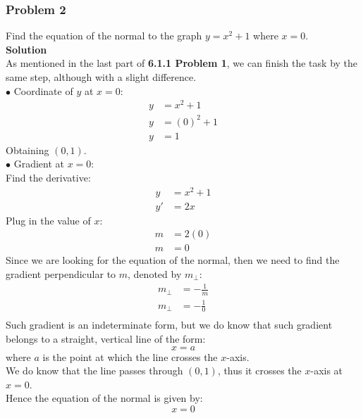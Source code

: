 \documentclass[hidelinks, a4paper, 12pt]{article}
\newcommand{\bd}{\textbf}
\newcommand{\n}{\\[\baselineskip]}
\begin{document}
            \subsubsection{Problem 2}
                Find the equation of the normal to the graph $y = x^2 + 1$ where $x = 0$.\n
                \bd{Solution}\n
                As mentioned in the last part of \bd{6.1.1 Problem 1}, we can finish the task by the same step, although with a slight
                difference.\n
                $\bullet$ Coordinate of $y$ at $x = 0$:
                \[\begin{split}
                    y &= x^2 + 1\\
                    y &= (0)^2 + 1\\
                    y &= 1
                \end{split}\]
                Obtaining $(0, 1)$.\n
                $\bullet$ Gradient at $x = 0$:\n
                Find the derivative:
                \[\begin{split}
                    y &= x^2 + 1\\
                    y' &= 2x
                \end{split}\]
                Plug in the value of $x$:
                \[\begin{split}
                    m &= 2(0)\\
                    m &= 0
                \end{split}\]
                Since we are looking for the equation of the normal, then we need to find the gradient perpendicular to $m$, denoted by $m_\perp$:
                \[\begin{split}
                    m_{\perp} &= -\frac{1}{m}\\
                    m_{\perp} &= -\frac{1}{0}\\
                \end{split}\]
                Such gradient is an indeterminate form, but we do know that such gradient belongs to a straight, vertical line of the form:
                \[x = a\]
                where $a$ is the point at which the line crosses the $x$-axis.\n
                We do know that the line passes through $(0, 1)$, thus it crosses the $x$-axis at $x = 0$.\n
                Hence the equation of the normal is given by:
                \[x = 0\]
\end{document}
